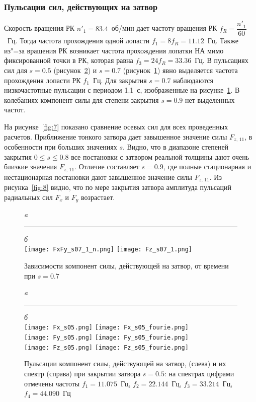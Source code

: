 \subsubsection{Пульсации сил, действующих на затвор}
\label{s:4523}
Скорость вращения РК $n'_1=83.4$~об/мин дает частоту вращения РК $f_R=\dfrac{n'_1}{60}$~Гц. Тогда частота 
прохождения одной лопасти $f_1=8f_R=11.12$~Гц. Также из"=за вращения РК возникает частота прохождения лопатки 
НА мимо фиксированной точки в РК, которая равна $f_3=24f_R=33.36$~Гц. В пульсациях сил для $s=0.5$ 
(рисунок~\ref{fig:62}) и $s=0.7$ (рисунок~\ref{fig:63}) явно выделяется частота прохождения 
лопасти РК $f_1$~Гц. Для закрытия $s=0.7$ наблюдаются низкочастотные пульсации с периодом 1.1~с, изображенные 
на рисунке~\ref{fig:63}. В колебаниях компонент силы для степени закрытия $s=0.9$ нет выделенных частот.

На рисунке~\ref{fig:7} показано сравнение осевых сил для всех проведенных расчетов. Приближение тонкого затвора 
дает завышенное значение силы $F_{z,\, 11}$, в особенности при больших значениях $s$. Видно, что в диапазоне 
степеней закрытия $0\leq s\leq 0.8$ все постановки с затвором реальной толщины дают очень близкие значения 
$F_{z,\, 11}$. Отличие составляет $s=0.9$, где полные стационарная и нестационарная постановки дают завышенное 
значение силы  $F_{z,\, 11}$. Из рисунка~\ref{fig:8} видно, что по мере закрытия затвора амплитуда пульсаций 
радиальных сил $F_x$ и $F_y$ возрастает. \vspace{-5mm}
\begin{figure}[h!]
  \centering \small \emph{a}\rule{90mm}{0mm}\emph{б}\\[0.5mm]
  {\texttt{[image: FxFy\_s07\_1\_n.png]}}\hfill
  {\texttt{[image: Fz\_s07\_1.png]}}\\  
  \caption{Зависимости компонент силы, действующей на затвор, от времени при $s=0.7$}
  \label{fig:63}
\end{figure}

\begin{figure}[!p]
  \centering \small \emph{a}\rule{90mm}{0mm}\emph{б}\\[0.5mm]
  {\texttt{[image: Fx\_s05.png]}}\hfill
  {\texttt{[image: Fx\_s05\_fourie.png]}}\\  
  {\texttt{[image: Fy\_s05.png]}}\hfill
  {\texttt{[image: Fy\_s05\_fourie.png]}}\\  
  {\texttt{[image: Fz\_s05.png]}}\hfill
  {\texttt{[image: Fz\_s05\_fourie.png]}}\\  
  \caption{Пульсации компонент силы, действующей на затвор, (слева) и их спектр (справа) при закрытии 
          затвора $s=0.5$: на спектрах цифрами отмечены частоты $f_1=11.075$~Гц, $f_2=22.144$~Гц, 
          $f_3=33.214$~Гц, $f_4=44.090$~Гц}
  \label{fig:62}
\end{figure}
\clearpage

